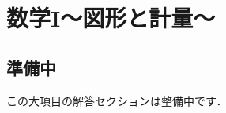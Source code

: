 \documentclass[../../ms_a.tex]{subfiles}
\begin{document}
\section{数学I～図形と計量～}

\subsection*{準備中}
この大項目の解答セクションは整備中です．
\end{document}
